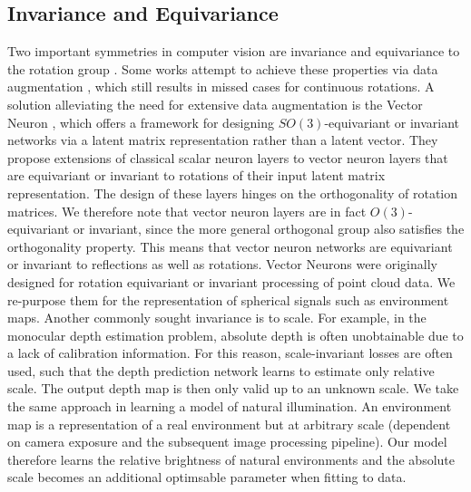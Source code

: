 \subsection{Invariance and Equivariance}\label{sec:litrevinv}

Two important symmetries in computer vision are invariance and equivariance to the rotation group \cite{bronstein_geometric_2021}. Some works attempt to achieve these properties via data augmentation \cite{yu_outdoor_2021, qi_pointnet_2017, sztrajman_high-dynamic-range_2020}, which still results in missed cases for continuous rotations. A solution alleviating the need for extensive data augmentation is the Vector Neuron \cite{deng_vector_2021}, which offers a framework for designing $SO(3)$-equivariant or invariant networks via a latent matrix representation rather than a latent vector. They propose extensions of classical scalar neuron layers to vector neuron layers that are equivariant or invariant to rotations of their input latent matrix representation. The design of these layers hinges on the orthogonality of rotation matrices. We therefore note that vector neuron layers are in fact $O(3)$-equivariant or invariant, since the more general orthogonal group also satisfies the orthogonality property. This means that vector neuron networks are equivariant or invariant to reflections as well as rotations. Vector Neurons were originally designed for rotation equivariant or invariant processing of point cloud data. We re-purpose them for the representation of spherical signals such as environment maps. Another commonly sought invariance is to scale. For example, in the monocular depth estimation problem, absolute depth is often unobtainable due to a lack of calibration information. For this reason, scale-invariant losses \cite{eigenDepthMapPrediction2014} are often used, such that the depth prediction network learns to estimate only relative scale. The output depth map is then only valid up to an unknown scale. We take the same approach in learning a model of natural illumination. An environment map is a representation of a real environment but at arbitrary scale (dependent on camera exposure and the subsequent image processing pipeline). Our model therefore learns the relative brightness of natural environments and the absolute scale becomes an additional optimsable parameter when fitting to data.